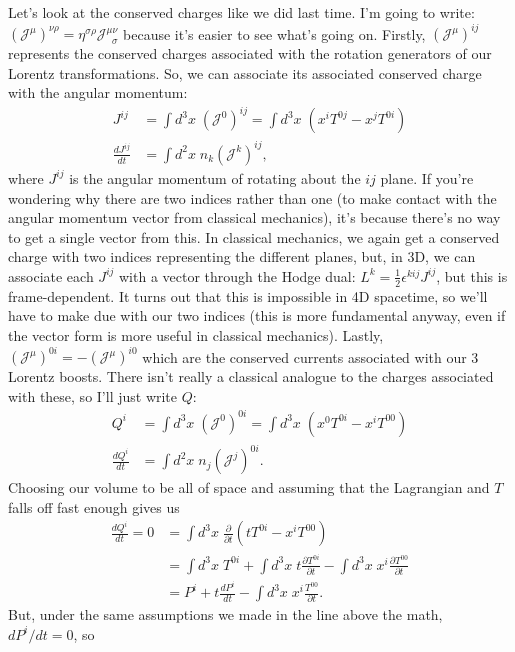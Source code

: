 Let's look at the conserved charges like we did last time. I'm going to write: $(\mathcal{J}^\mu)^{\nu\rho}=\eta^{\sigma\rho}\mathcal{J}^{\mu\nu}_{\;\;\sigma}$ because it's easier to see what's going on. Firstly, $(\mathcal{J}^\mu)^{ij}$ represents the conserved charges associated with the rotation generators of our Lorentz transformations. So, we can associate its associated conserved charge with the angular momentum:
\begin{align*}
    J^{ij} &= \int d^3x\;(\mathcal{J}^0)^{ij}=\int d^3x\; (x^i T^{0j}-x^j T^{0i})\\
    \frac{dJ^{ij}}{dt} &= \int d^2x\; n_k (\mathcal{J}^k)^{ij},
\end{align*}
where $J^{ij}$ is the angular momentum of rotating about the $ij$ plane. If you're wondering why there are two indices rather than one (to make contact with the angular momentum vector from classical mechanics), it's because there's no way to get a single vector from this. In classical mechanics, we again get a conserved charge with two indices representing the different planes, but, in 3D, we can associate each $J^{ij}$ with a vector through the Hodge dual: $L^k = \frac{1}{2}\epsilon^{kij}J^{ij}$, but this is frame-dependent. It turns out that this is impossible in 4D spacetime, so we'll have to make due with our two indices (this is more fundamental anyway, even if the vector form is more useful in classical mechanics). Lastly, $(\mathcal{J}^\mu)^{0i}=-(\mathcal{J}^\mu)^{i0}$ which are the conserved currents associated with our 3 Lorentz boosts. There isn't really a classical analogue to the charges associated with these, so I'll just write $Q$:
\begin{align*}
    Q^i &= \int d^3x\;(\mathcal{J}^0)^{0i} = \int d^3x\;(x^0 T^{0i} - x^i T^{00})\\
    \frac{dQ^i}{dt} &= \int d^2x\; n_j (\mathcal{J}^j)^{0i}.
\end{align*}
Choosing our volume to be all of space and assuming that the Lagrangian and $T$ falls off fast enough gives us
\begin{align*}
    \frac{dQ^i}{dt} = 0 &= \int d^3x\; \frac{\partial}{\partial t}\left(t T^{0i} - x^i T^{00}\right)\\
    & = \int d^3x\; T^{0i} + \int d^3x\;t\frac{\partial T^{0i}}{\partial t} - \int d^3x\;x^i\frac{\partial T^{00}}{\partial t}\\
    & = P^i + t\frac{dP^i}{dt}- \int d^3x\; x^i\frac{T^{00}}{\partial t}.
\end{align*}
But, under the same assumptions we made in the line above the math, $dP^i/dt=0$, so
